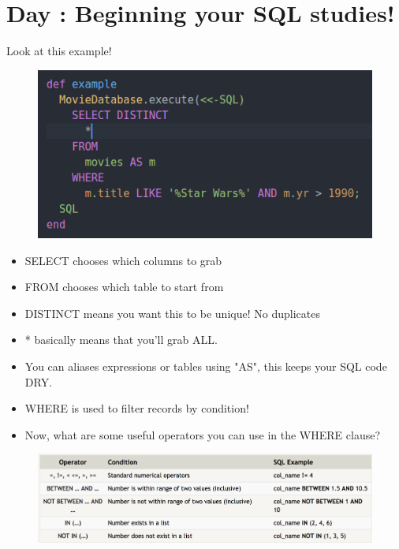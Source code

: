 \documentclass{42-en}
\begin{document}
\chapter{Day \exercicenumber: Beginning your SQL studies! }

\makeheaderfiles

	Look at this example! \\
    
            \begin{figure}[H]
                \begin{center}
                    \includegraphics[width=14cm]{Ex00.png}
                \end{center}
            \end{figure}

	\begin{itemize}\itemsep1pt 
		\item SELECT chooses which columns to grab 
		\item FROM chooses which table to start from
		\item DISTINCT means you want this to be unique! No duplicates 
		\item * basically means that  you'll grab ALL. 
		\item You can aliases expressions or tables using "AS", this keeps your SQL code DRY. 
		\item WHERE is used to filter records by condition! 
		\item Now, what are some useful operators you can use in the WHERE clause?  
	\end{itemize}

    
            \begin{figure}[H]
                \begin{center}
                    \includegraphics[width=14cm]{operators.png}
                \end{center}
            \end{figure}
\end{document}
